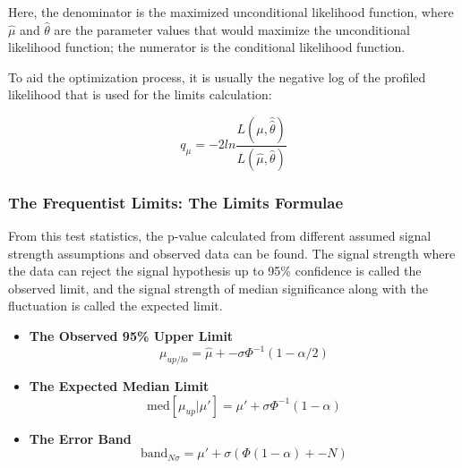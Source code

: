 Here, the denominator is the maximized unconditional likelihood function, where $\hat{\mu}$ and $\hat{\theta}$ are the parameter values that would maximize the unconditional likelihood function; the numerator is the conditional likelihood function.

To aid the optimization process, it is usually the negative log of the profiled likelihood that is used for the limits calculation:

\begin{equation}
    q_{\mu} = -2 ln \frac{L(\mu, \hat{\hat{\theta}})}{L(\hat{\mu}, \hat{\theta})}
\label{teststats}
\end{equation}


\subsubsection{The Frequentist Limits: The Limits Formulae}
\label{sec:freqlimits}

From this test statistics, the p-value calculated from different assumed signal strength assumptions and observed data can be found. The signal strength where the data can reject the signal hypothesis up to 95\% confidence is called the observed limit, and the signal strength of median significance along with the fluctuation is called the expected limit. 

\begin{itemize}


\item \textbf{The Observed 95\% Upper Limit}
\begin{equation}
\mu_{up/lo} = \hat{\mu} +- \sigma\Phi^{-1}(1-\alpha/2)
\end{equation}

\item \textbf{The Expected Median Limit}
\begin{equation}
    \mathrm{med}[\mu_{up}|\mu'] = \mu' + \sigma\Phi^{-1}(1-\alpha) 
\end{equation}

\item \textbf{The Error Band}
\begin{equation}
    \mathrm{band}_{N\sigma} = \mu' + \sigma(\Phi(1-\alpha)+-N)
\end{equation}

\end{itemize}


